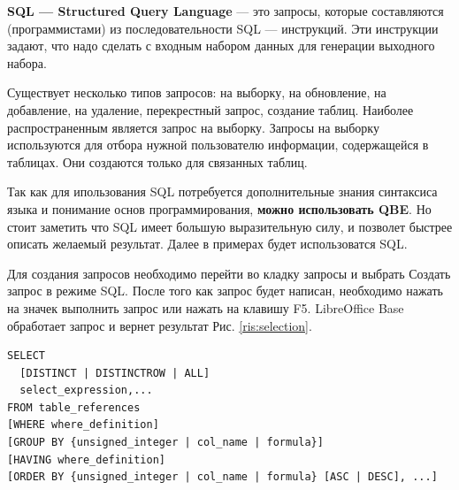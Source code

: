 \documentclass[a4paper]{article}
\begin{document}
\textbf{SQL --- Structured Query Language} --- это запросы, которые составляются (программистами) из последовательности SQL --- инструкций. Эти инструкции задают, что надо сделать с входным набором данных для генерации выходного набора.

Существует несколько типов запросов: на выборку, на обновление, на добавление, на удаление, перекрестный запрос, создание таблиц. Наиболее распространенным является запрос на выборку. Запросы на выборку используются для отбора нужной пользователю информации, содержащейся в таблицах. Они создаются только для связанных таблиц.

Так как для ипользования SQL потребуется дополнительные знания синтаксиса языка и понимание основ программирования, \textbf{можно использовать QBE}. Но стоит заметить что SQL имеет большую выразительную силу, и позволет быстрее описать желаемый результат. Далее в примерах будет использоватся SQL.

Для создания запросов необходимо перейти во кладку запросы и выбрать Создать запрос в режиме SQL. После того как запрос будет написан, необходимо нажать на значек выполнить запрос или нажать на клавишу F5. LibreOffice Base обработает запрос и вернет результат Рис. \ref{ris:selection}.

\begin{figure}[h]
\end{figure}

\newpage
\begin{lstlisting}[label=select, caption=Базовая структура запроса]
SELECT
  [DISTINCT | DISTINCTROW | ALL]
  select_expression,...
FROM table_references
[WHERE where_definition]
[GROUP BY {unsigned_integer | col_name | formula}]
[HAVING where_definition]
[ORDER BY {unsigned_integer | col_name | formula} [ASC | DESC], ...]
\end{lstlisting}
\end{document}

